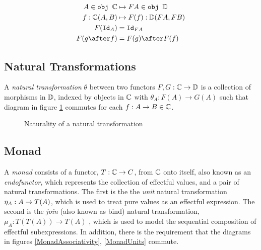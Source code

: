 \documentclass{Report}
\begin{document}
\begin{align*}
    A\in\obj\C &\mapsto FA \in \obj\DC\\
    f: \C(A, B) &\mapsto F(f): \DC(FA, FB)\\
    F(\Id{A}) & = \Id{FA} \\
    F(g\after f) & = F(g)\after F(f)
\end{align*}

\subsection{Natural Transformations}

A \textit{natural transformation} $\theta$ between two functors $F, G: \mathbb{C} \rightarrow \mathbb{D}$ is a collection of morphisms in $\mathbb{D}$, indexed by objects in $\mathbb{C}$ with  $\theta_A: F(A) \rightarrow G(A)$ such that diagram in figure \ref{Naturality} commutes for each $f: A \rightarrow B \in \mathbb{C}$.

\begin{figure}
    \centering
    \begin{minipage}{0.45\textwidth}
        \centering
        \begin{framed}
    \end{framed}
        \caption{Naturality of a natural transformation}
        \label{Naturality}
    \end{minipage}\hfill
\end{figure}



\subsection{Monad}
A \textit{monad} consists of a functor, $T: \mathbb{C} \rightarrow C$, from $\mathbb{C}$ onto itself, also known as an \textit{endofunctor}, which represents the collection of effectful values, and a pair of natural transformations. The first is the the \textit{unit} natural transformation $\eta_{A}: A\rightarrow T(A)$, which is used to treat pure values as an effectful expression. The second is the \textit{join} (also known as bind) natural transformation, $\mu_{A}: T(T(A)) \rightarrow T(A)$ ,  which is used to model the sequential composition of effectful subexpressions. In addition, there is the requirement that the diagrams in figures \ref{MonadAssociativity}, \ref{MonadUnits} commute.
\end{document}
